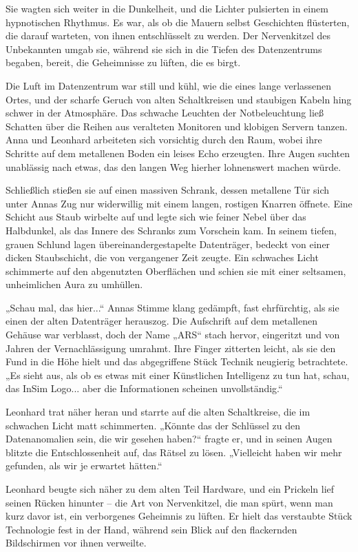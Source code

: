 \documentclass[
]{article}
\begin{document}
Sie wagten sich weiter in die Dunkelheit, und die Lichter pulsierten in
einem hypnotischen Rhythmus. Es war, als ob die Mauern selbst
Geschichten flüsterten, die darauf warteten, von ihnen entschlüsselt zu
werden. Der Nervenkitzel des Unbekannten umgab sie, während sie sich in
die Tiefen des Datenzentrums begaben, bereit, die Geheimnisse zu lüften,
die es birgt.

Die Luft im Datenzentrum war still und kühl, wie die eines lange
verlassenen Ortes, und der scharfe Geruch von alten Schaltkreisen und
staubigen Kabeln hing schwer in der Atmosphäre. Das schwache Leuchten
der Notbeleuchtung ließ Schatten über die Reihen aus veralteten
Monitoren und klobigen Servern tanzen. Anna und Leonhard arbeiteten sich
vorsichtig durch den Raum, wobei ihre Schritte auf dem metallenen Boden
ein leises Echo erzeugten. Ihre Augen suchten unablässig nach etwas, das
den langen Weg hierher lohnenswert machen würde.

Schließlich stießen sie auf einen massiven Schrank, dessen metallene Tür
sich unter Annas Zug nur widerwillig mit einem langen, rostigen Knarren
öffnete. Eine Schicht aus Staub wirbelte auf und legte sich wie feiner
Nebel über das Halbdunkel, als das Innere des Schranks zum Vorschein
kam. In seinem tiefen, grauen Schlund lagen übereinandergestapelte
Datenträger, bedeckt von einer dicken Staubschicht, die von vergangener
Zeit zeugte. Ein schwaches Licht schimmerte auf den abgenutzten
Oberflächen und schien sie mit einer seltsamen, unheimlichen Aura zu
umhüllen.

„Schau mal, das hier...`` Annas Stimme klang gedämpft, fast ehrfürchtig,
als sie einen der alten Datenträger herauszog. Die Aufschrift auf dem
metallenen Gehäuse war verblasst, doch der Name „ARS`` stach hervor,
eingeritzt und von Jahren der Vernachlässigung umrahmt. Ihre Finger
zitterten leicht, als sie den Fund in die Höhe hielt und das
abgegriffene Stück Technik neugierig betrachtete. „Es sieht aus, als ob
es etwas mit einer Künstlichen Intelligenz zu tun hat, schau, das InSim
Logo... aber die Informationen scheinen unvollständig.``

Leonhard trat näher heran und starrte auf die alten Schaltkreise, die im
schwachen Licht matt schimmerten. „Könnte das der Schlüssel zu den
Datenanomalien sein, die wir gesehen haben?{\kern0pt}`` fragte er, und
in seinen Augen blitzte die Entschlossenheit auf, das Rätsel zu lösen.
„Vielleicht haben wir mehr gefunden, als wir je erwartet hätten.``

Leonhard beugte sich näher zu dem alten Teil Hardware, und ein Prickeln
lief seinen Rücken hinunter -- die Art von Nervenkitzel, die man spürt,
wenn man kurz davor ist, ein verborgenes Geheimnis zu lüften. Er hielt
das verstaubte Stück Technologie fest in der Hand, während sein Blick
auf den flackernden Bildschirmen vor ihnen verweilte.
\end{document}
